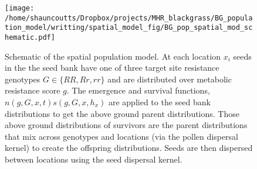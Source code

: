 \documentclass[12pt, a4paper]{article}
\begin{document}
 


\begin{figure}[htbp] \label{fig:schematic}
	\texttt{[image: /home/shauncoutts/Dropbox/projects/MHR\_blackgrass/BG\_population\_model/writting/spatial\_model\_fig/BG\_pop\_spatial\_mod\_schematic.pdf]}
\caption{Schematic of the spatial population model. At each location $x_i$ seeds in the the seed bank have one of three target site resistance genotypes $G \in \{RR, Rr, rr\}$ and are distributed over metabolic resistance score $g$. The emergence and survival functions, $n(g, G, x, t)s(g, G, x, h_x)$ are applied to the seed bank distributions to get the above ground parent distributions. Those above ground distributions of survivors are the parent distributions that mix across genotypes and locations (via the pollen dispersal kernel) to create the offspring distributions. Seeds are then dispersed between locations using the seed dispersal kernel.}
\end{figure}
\end{document}
